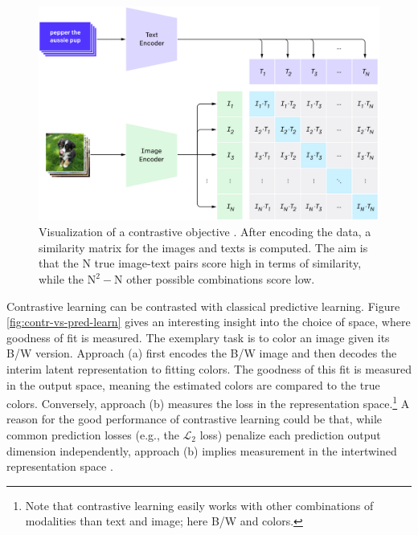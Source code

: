 \documentclass[
]{krantz}
\begin{document}
\begin{figure}

{\centering \includegraphics[width=1\linewidth]{figures/02-04-text-support-img/contrastive-pre-training} 

}

\caption{Visualization of a contrastive objective \citep{radford2021learning}. After encoding the data, a similarity matrix for the images and texts is computed. The aim is that the N true image-text pairs score high in terms of similarity, while the \(\text{N}^2 - \text{N}\) other possible combinations score low.}\label{fig:contr-viz}
\end{figure}



Contrastive learning can be contrasted with classical predictive learning.
Figure \ref{fig:contr-vs-pred-learn} gives an interesting insight into the choice of space, where goodness of fit is measured.
The exemplary task is to color an image given its B/W version.
Approach (a) first encodes the B/W image and then decodes the interim latent representation to fitting colors.
The goodness of this fit is measured in the output space, meaning the estimated colors are compared to the true colors.
Conversely, approach (b) measures the loss in the representation space.\footnote{Note that contrastive learning easily works with other combinations of modalities than text and image; here B/W and colors.}
A reason for the good performance of contrastive learning could be that, while common prediction losses (e.g., the \(\mathcal{L}_2\) loss) penalize each prediction output dimension independently, approach (b) implies measurement in the intertwined representation space \citep{tian2020contrastive}.
\end{document}

